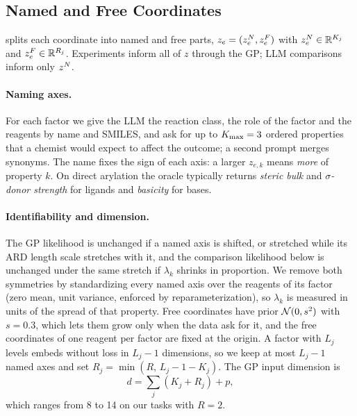 \subsection{Named and Free Coordinates}
\label{sec:coords}
\ours{} splits each coordinate into named and free parts, $z_e=(z^{N}_e,z^{F}_e)$ with $z^{N}_e\in\mathbb{R}^{K_j}$ and $z^{F}_e\in\mathbb{R}^{R_j}$. Experiments inform all of $z$ through the GP; LLM comparisons inform only $z^{N}$.

\paragraph{Naming axes.}
For each factor we give the LLM the reaction class, the role of the factor and the reagents by name and SMILES, and ask for up to $K_{\max}=3$ ordered properties that a chemist would expect to affect the outcome; a second prompt merges synonyms. The name fixes the sign of each axis: a larger $z_{e,k}$ means \emph{more} of property $k$. On direct arylation the oracle typically returns \emph{steric bulk} and \emph{$\sigma$-donor strength} for ligands and \emph{basicity} for bases.

\paragraph{Identifiability and dimension.}
The GP likelihood is unchanged if a named axis is shifted, or stretched while its ARD length scale stretches with it, and the comparison likelihood below is unchanged under the same stretch if $\lambda_k$ shrinks in proportion. We remove both symmetries by standardizing every named axis over the reagents of its factor (zero mean, unit variance, enforced by reparameterization), so $\lambda_k$ is measured in units of the spread of that property. Free coordinates have prior $\mathcal{N}(0,s^2)$ with $s=0.3$, which lets them grow only when the data ask for it, and the free coordinates of one reagent per factor are fixed at the origin. A factor with $L_j$ levels embeds without loss in $L_j-1$ dimensions, so we keep at most $L_j-1$ named axes and set $R_j=\min(R,\,L_j-1-K_j)$. The GP input dimension is
\begin{equation}
d=\textstyle\sum_{j}(K_j+R_j)+p,
\label{eq:dim}
\end{equation}
which ranges from 8 to 14 on our tasks with $R=2$.


